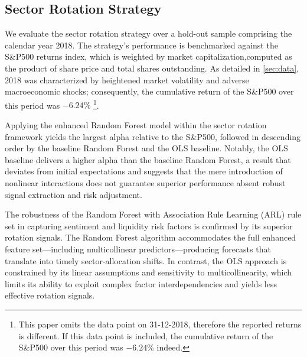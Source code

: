 
\subsection{Sector Rotation Strategy}

We evaluate the sector rotation strategy over a hold-out sample comprising the calendar year 2018. The strategy's performance is benchmarked against the S\&P500 returns index, which is weighted by market capitalization,computed as the product of share price and total shares outstanding. As detailed in \cref{sec:data}, 2018 was characterized by heightened market volatility and adverse macroeconomic shocks; consequently, the cumulative return of the S\&P500 over this period was $-6.24\%$ \footnote{This paper omits the data point on 31-12-2018, therefore the reported returns is different. If this data point is included, the cumulative return of the S\&P500 over this period was $-6.24\%$ indeed.}.

Applying the enhanced Random Forest model within the sector rotation framework yields the largest alpha relative to the S\&P500, followed in descending order by the baseline Random Forest and the OLS baseline. Notably, the OLS baseline delivers a higher alpha than the baseline Random Forest, a result that deviates from initial expectations and suggests that the mere introduction of nonlinear interactions does not guarantee superior performance absent robust signal extraction and risk adjustment.

The robustness of the Random Forest with Association Rule Learning (ARL) rule set in capturing sentiment and liquidity risk factors is confirmed by its superior rotation signals. The Random Forest algorithm accommodates the full enhanced feature set—including multicollinear predictors—producing forecasts that translate into timely sector-allocation shifts. In contrast, the OLS approach is constrained by its linear assumptions and sensitivity to multicollinearity, which limits its ability to exploit complex factor interdependencies and yields less effective rotation signals.

